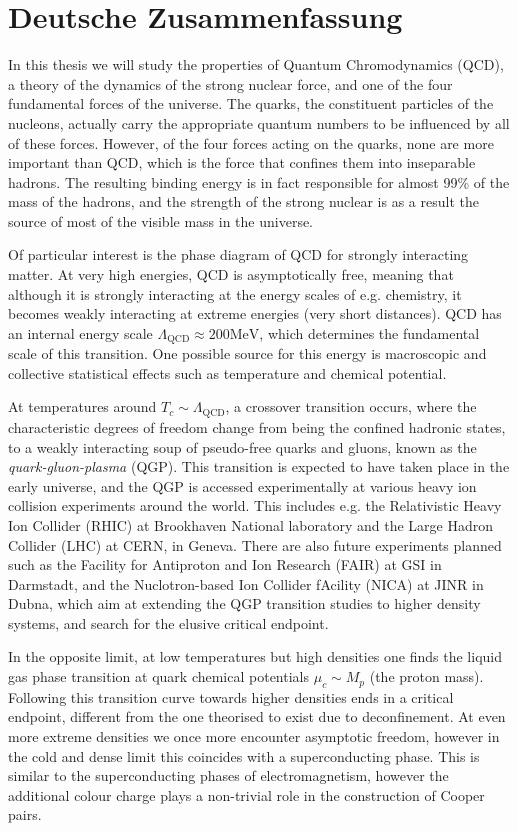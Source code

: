 \chapter*{Deutsche Zusammenfassung}
{\fontsize{12pt}{18pt}\selectfont

In this thesis we will study the properties of Quantum Chromodynamics (QCD), a
theory of the dynamics of the strong nuclear force, and one of the four
fundamental forces of the universe. The quarks, the constituent particles of the
nucleons, actually carry the appropriate quantum numbers to be influenced by all
of these forces. However, of the four forces acting on the quarks, none are more
important than QCD, which is the force that confines them into inseparable
hadrons. The resulting binding energy is in fact responsible for almost 99\% of
the mass of the hadrons, and the strength of the strong nuclear is as a
result the source of most of the visible mass in the universe.

Of particular interest is the phase diagram of QCD for strongly interacting
matter. At very high energies, QCD is asymptotically free, meaning that although
it is strongly interacting at the energy scales of e.g. chemistry, it becomes
weakly interacting at extreme energies (very short distances). QCD has an
internal energy scale $\Lambda_{\mathrm{QCD}} \approx 200 \mathrm{MeV}$, which
determines the fundamental scale of this transition. One possible source for
this energy is macroscopic and collective statistical effects such as
temperature and chemical potential.

At temperatures around $T_c \sim \Lambda_{\mathrm{QCD}}$, a crossover transition
occurs, where the characteristic degrees of freedom change from being the
confined hadronic states, to a weakly interacting soup of pseudo-free quarks and
gluons, known as the \emph{quark-gluon-plasma} (QGP). This transition is expected to
have taken place in the early universe, and the QGP is accessed experimentally
at various heavy ion collision experiments around the world. This includes e.g.
the Relativistic Heavy Ion Collider (RHIC) at Brookhaven National laboratory and
the Large Hadron Collider (LHC) at CERN, in Geneva. There are also future
experiments planned such as the Facility for Antiproton and Ion Research (FAIR)
at GSI in Darmstadt, and the Nuclotron-based Ion Collider fAcility (NICA) at
JINR in Dubna, which aim at extending the QGP transition studies to higher
density systems, and search for the elusive critical endpoint.

In the opposite limit, at low temperatures but high densities one finds the
liquid gas phase transition at quark chemical potentials $\mu_c \sim M_p$ (the
proton mass). Following this transition curve towards higher densities ends in a
critical endpoint, different from the one theorised to exist due to
deconfinement. At even more extreme densities we once more encounter
asymptotic freedom, however in the cold and dense limit this coincides with
a superconducting phase. This is similar to the superconducting phases of
electromagnetism, however the additional colour charge plays a non-trivial role
in the construction of Cooper pairs.

}
